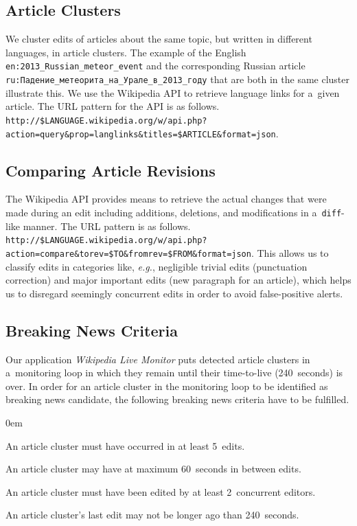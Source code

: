 \subsection{Article Clusters}

We cluster edits of articles about the same topic,
but written in different languages, in article clusters.
The example of the English
\texttt{en:2013\_Russian\_meteor\_event}
and the corresponding Russian article
\texttt{ru:{\selectfont Падение\_метеорита\_на\_Урале\_в\_2013\_году}}
that are both in the same cluster illustrate this.
We use the Wikipedia API to retrieve language links for a~given article.
The URL pattern for the API is as follows.
\texttt{http://\$LANGUAGE.\-wikipedia.org/w/api.php?action=query\&prop=langlinks\&titles=\$ARTICLE\&form\-at=json}.

\subsection{Comparing Article Revisions}
\label{sec:comparing-article-revisions}

The Wikipedia API provides means to retrieve the actual changes
that were made during an edit including additions, deletions,
and modifications in a~\texttt{diff}-like manner.
The URL pattern is as follows.
\texttt{http://\$LANGUAGE.wikipedia.org/w/api.php?action=co\-mpare\&torev=\$TO\&fromrev=\$FROM\&format=json}.
This allows us to classify edits in categories like, \emph{e.g.},
negligible trivial edits (punctuation correction) and 
major important edits (new paragraph for an article),
which helps us to disregard seemingly concurrent edits
in order to avoid false-positive alerts.

\subsection{Breaking News Criteria}

Our application \emph{Wikipedia Live Monitor} puts  
detected article clusters in a~monitoring loop in which they remain
until their time-to-live (240~seconds) is over.
In order for an article cluster in the monitoring loop
to be identified as breaking news candidate,
the following breaking news criteria have to be fulfilled.

\begin{description}
  \itemsep0em
  \item[$\geq$~5~Occurrences:] An article cluster must have occurred
  in at least 5~edits.
  \item[$\leq$~60~Seconds Between Edits:] An article cluster may have
  at maximum 60~seconds in between edits.
  \item[$\geq$~2~Concurrent Editors:] An article cluster must have been edited
  by at least 2~concurrent editors.
  \item[$\leq$~240~Seconds Since Last Edit:] An article cluster's last edit
  may not be longer ago than 240~seconds.
\end{description}

